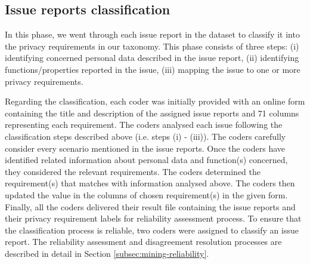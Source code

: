 \subsection{Issue reports classification}

In this phase, we went through each issue report in the dataset to classify it into the privacy requirements in our taxonomy. This phase consists of three steps: (i) identifying concerned personal data described in the issue report, (ii) identifying functions/properties reported in the issue, (iii) mapping the issue to one or more privacy requirements. 

Regarding the classification, each coder was initially provided with an online form containing the title and description of the assigned issue reports and 71 columns representing each requirement. The coders analysed each issue following the classification steps described above (i.e. steps (i) - (iii)). The coders carefully consider every scenario mentioned in the issue reports. Once the coders have identified related information about personal data and function(s) concerned, they considered the relevant requirements. The coders determined the requirement(s) that matches with information analysed above. The coders then updated the value in the columns of chosen requirement(s) in the given form. Finally, all the coders delivered their result file containing the issue reports and their privacy requirement labels for reliability assessment process. To ensure that the classification process is reliable, two coders were assigned to classify an issue report. The reliability assessment and disagreement resolution processes are described in detail in Section \ref{subsec:mining-reliability}.

